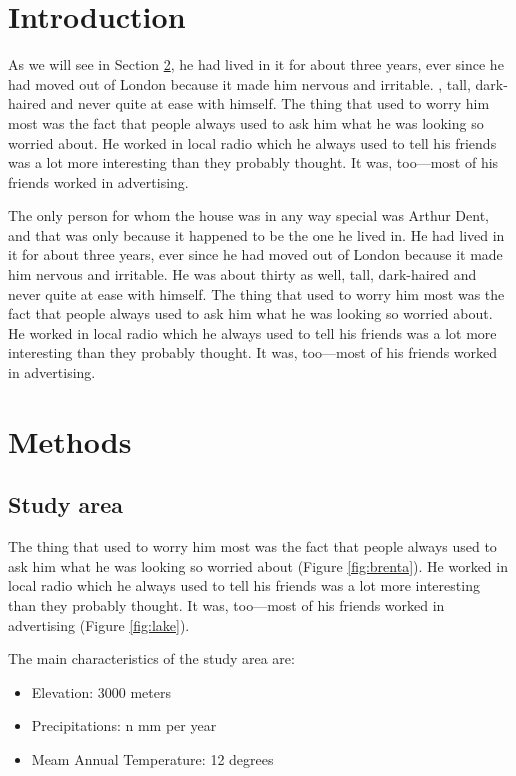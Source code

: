 \section{Introduction} %

 As we will see in Section \ref{sec:methods}, he had lived in it for about three years, ever since he had moved out of London because it made him nervous and irritable. , tall, dark-haired and never quite at ease with himself. The thing that used to worry him most was the fact that people always used to ask him what he was looking so worried about. He worked in local radio which he always used to tell his friends was a lot more interesting than they probably thought. It was, too—most of his friends worked in advertising.

The only person for whom the house was in any way special was Arthur Dent, and that was only because it happened to be the one he lived in. He had lived in it for about three years, ever since he had moved out of London because it made him nervous and irritable. He was about thirty as well, tall, dark-haired and never quite at ease with himself. The thing that used to worry him most was the fact that people always used to ask him what he was looking so worried about. He worked in local radio which he always used to tell his friends was a lot more interesting than they probably thought. It was, too—most of his friends worked in advertising.

\section{Methods}\label{sec:methods}
\subsection{Study area} %
The thing that used to worry him most was the fact that people always used to ask him what he was looking so worried about (Figure \ref{fig:brenta}). He worked in local radio which he always used to tell his friends was a lot more interesting than they probably thought. It was, too—most of his friends worked in advertising (Figure \ref{fig:lake}).

\noindent The main characteristics of the study area are:
\begin{itemize}
    \item Elevation: 3000 meters
    \item Precipitations: n mm per year
    \item Meam Annual Temperature: 12 degrees
\end{itemize}

